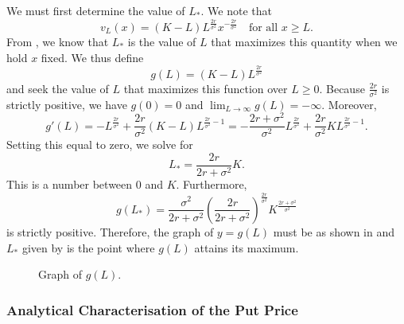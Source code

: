We must first determine the value of \(L_*\). We note that
\begin{equation}
	\label{eq:VLAboveL}
	v_L(x) = (K - L)L^{\frac{2r}{\sigma^2}} x^{-\frac{2r}{\sigma^2}} \quad \text{for all } x \ge L.
\end{equation}
From , we know that \(L_*\) is the value of \(L\) that maximizes this quantity when we hold \(x\) fixed. We thus define
\begin{equation}
	\label{eq:GLDefinition}
	g(L) = (K - L)L^{\frac{2r}{\sigma^2}}
\end{equation}
and seek the value of \(L\) that maximizes this function over \(L \ge 0\). Because \(\frac{2r}{\sigma^2}\) is strictly positive, we have \(g(0) = 0\) and \(\lim_{L \to \infty} g(L) = -\infty\). Moreover,
\begin{equation}
	\label{eq:GPrimeL}
	g'(L) = -L^{\frac{2r}{\sigma^2}} + \frac{2r}{\sigma^2}(K - L)L^{\frac{2r}{\sigma^2}-1} = -\frac{2r + \sigma^2}{\sigma^2}L^{\frac{2r}{\sigma^2}} + \frac{2r}{\sigma^2} K L^{\frac{2r}{\sigma^2}-1}.
\end{equation}
Setting this equal to zero, we solve for
\begin{equation}
	\label{eq:LStar}
	L_* = \frac{2r}{2r + \sigma^2} K.
\end{equation}
This is a number between 0 and \(K\). Furthermore,
\begin{equation}
	\label{eq:GLStar}
	g(L_*) = \frac{\sigma^2}{2r + \sigma^2} \left( \frac{2r}{2r + \sigma^2} \right)^{\frac{2r}{\sigma^2}} K^{\frac{2r + \sigma^2}{\sigma^2}}
\end{equation}
is strictly positive. Therefore, the graph of \(y = g(L)\) must be as shown in  and \(L_*\) given by  is the point where \(g(L)\) attains its maximum.

\begin{figure}[H]
	\centering
	
	\caption{Graph of \(g(L)\).}\label{fig:GraphOfGL}
\end{figure}

\subsubsection{Analytical Characterisation of the Put Price}

